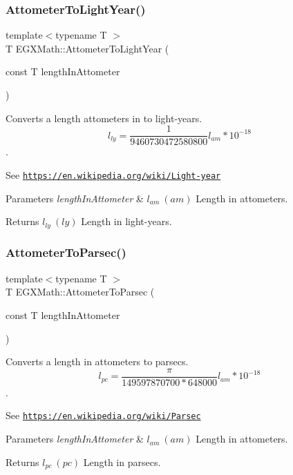 \subsubsection{\texorpdfstring{Attometer\+To\+Light\+Year()}{AttometerToLightYear()}}
{\footnotesize\ttfamily template$<$typename T $>$ \\
T E\+G\+X\+Math\+::\+Attometer\+To\+Light\+Year (\begin{DoxyParamCaption}\item[{const T}]{length\+In\+Attometer }\end{DoxyParamCaption})}



Converts a length attometers in to light-\/years. \[ l_{ly}= \frac{1}{9460730472580800} l_{am} * 10^{-18} \]. 

See \href{https://en.wikipedia.org/wiki/Light-year}{\tt https\+://en.\+wikipedia.\+org/wiki/\+Light-\/year} 
\begin{DoxyParams}{Parameters}
{\em length\+In\+Attometer} & $ l_{am}\ (am)$ Length in attometers. \\
\hline
\end{DoxyParams}
\begin{DoxyReturn}{Returns}
$ l_{ly}\ (ly)$ Length in light-\/years. 
\end{DoxyReturn}
\mbox{\label{group___e_g_x_math-_conversions-_length_conversions-_attometer-_astronomical_ga2f4a0e26e97c60a8f37a1f813d158f48}} 
\subsubsection{\texorpdfstring{Attometer\+To\+Parsec()}{AttometerToParsec()}}
{\footnotesize\ttfamily template$<$typename T $>$ \\
T E\+G\+X\+Math\+::\+Attometer\+To\+Parsec (\begin{DoxyParamCaption}\item[{const T}]{length\+In\+Attometer }\end{DoxyParamCaption})}



Converts a length in attometers to parsecs. \[ l_{pc}=\frac{\pi}{149597870700 * 648000} l_{am} * 10^{-18} \]. 

See \href{https://en.wikipedia.org/wiki/Parsec}{\tt https\+://en.\+wikipedia.\+org/wiki/\+Parsec} 
\begin{DoxyParams}{Parameters}
{\em length\+In\+Attometer} & $ l_{am}\ (am)$ Length in attometers. \\
\hline
\end{DoxyParams}
\begin{DoxyReturn}{Returns}
$ l_{pc}\ (pc)$ Length in parsecs. 
\end{DoxyReturn}
